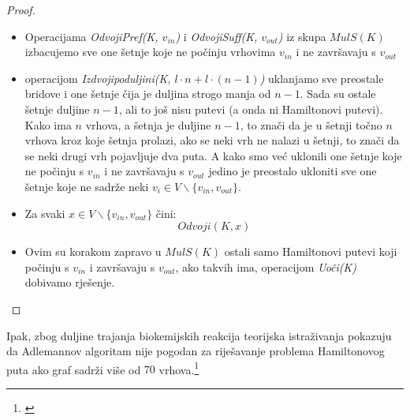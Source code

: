 \documentclass[12pt, a4paper]{book}
\begin{document}
\begin{spacing}{1.5}
\begin{proof}
\begin{itemize}
        \item Operacijama \textit{Odvoji\textunderscore Pref(K, $v_{in}$)} i \textit{Odvoji\textunderscore Suff(K, $v_{out}$)} iz skupa $MulS(K)$ izbacujemo sve one šetnje koje ne počinju vrhovima $v_{in}$ i ne završavaju s $v_{out}$
        \item operacijom \textit{Izdvoji\textunderscore po\textunderscore duljini(K, $l\cdot n + l\cdot (n-1)$)} uklanjamo sve preostale bridove i one šetnje čija je duljina strogo manja od $n-1$.
        Sada su ostale šetnje duljine $n-1$, ali to još nisu putevi (a onda ni Hamiltonovi putevi). Kako ima $n$ vrhova, a šetnja je duljine $n-1$, to znači da je u šetnji točno $n$ vrhova kroz koje šetnja prolazi, ako se neki vrh ne nalazi u šetnji, to znači da se neki drugi vrh pojavljuje dva puta. A kako smo već uklonili one šetnje koje ne počinju s  $v_{in}$ i ne završavaju s $v_{out}$ jedino je preostalo ukloniti sve one šetnje koje ne sadrže neki $v_i \in V \backslash \{v_{in}, v_{out}\}$.
        \item Za svaki $x \in V \backslash \{v_{in}, v_{out}\}$ čini:
        \[Odvoji(K,x)\]
        \item Ovim su korakom zapravo u $MulS(K)$ ostali samo Hamiltonovi putevi koji počinju s  $v_{in}$ i završavaju s $v_{out}$, ako takvih ima, operacijom \textit{Uoči(K)} dobivamo rješenje.
    \end{itemize} 
\end{proof}
Ipak, zbog duljine trajanja biokemijskih reakcija teorijska istraživanja pokazuju da Adlemannov algoritam nije pogodan za riješavanje problema Hamiltonovog puta ako graf sadrži više od $70$ vrhova.\footnote{\cite{Lipton}}

\end{spacing}
\end{document}

